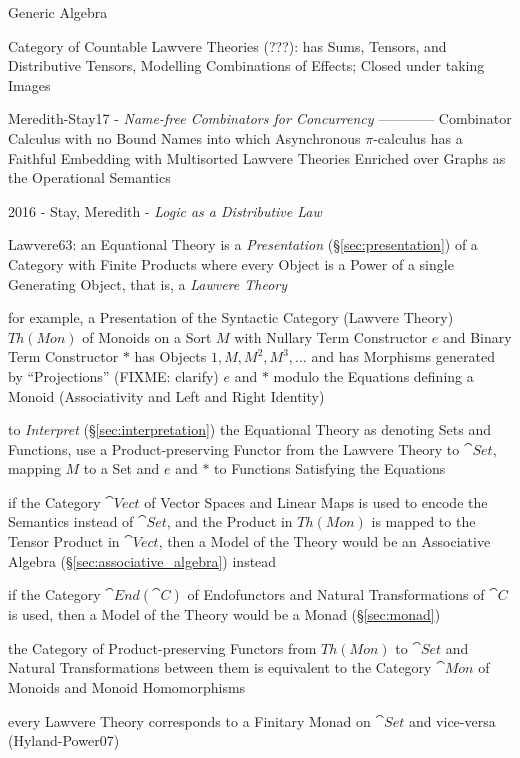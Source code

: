 Generic Algebra

Category of Countable Lawvere Theories (???): has Sums, Tensors, and
Distributive Tensors, Modelling Combinations of Effects; Closed under
taking Images \cite{hyland-power06}

Meredith-Stay17 - \emph{Name-free Combinators for Concurrency} ------------
Combinator Calculus with no Bound Names into which Asynchronous
$\pi$-calculus has a Faithful Embedding with Multisorted Lawvere
Theories Enriched over Graphs as the Operational Semantics

\asterism

2016 - Stay, Meredith - \emph{Logic as a Distributive Law}

Lawvere63: an Equational Theory is a \emph{Presentation}
(\S\ref{sec:presentation}) of a Category with Finite Products
where every Object is a Power of a single Generating Object, that is, a
\emph{Lawvere Theory}

for example, a Presentation of the Syntactic Category (Lawvere Theory) $Th(Mon)$
of Monoids on a Sort $M$ with Nullary Term Constructor $e$ and Binary Term
Constructor $*$ has Objects $1, M, M^2, M^3, \ldots$ and has Morphisms generated
by ``Projections'' (FIXME: clarify) $e$ and $*$ modulo the Equations defining a
Monoid (Associativity and Left and Right Identity)

to \emph{Interpret} (\S\ref{sec:interpretation}) the Equational Theory as
denoting Sets and Functions, use a Product-preserving Functor from the Lawvere
Theory to $\cat{Set}$, mapping $M$ to a Set and $e$ and $*$ to Functions
Satisfying the Equations

if the Category $\cat{Vect}$ of Vector Spaces and Linear Maps is used to encode
the Semantics instead of $\cat{Set}$, and the Product in $Th(Mon)$ is mapped to
the Tensor Product in $\cat{Vect}$, then a Model of the Theory would be an
Associative Algebra (\S\ref{sec:associative_algebra}) instead

if the Category $\cat{End}(\cat{C})$ of Endofunctors and Natural Transformations
of $\cat{C}$ is used, then a Model of the Theory would be a Monad
(\S\ref{sec:monad})

the Category of Product-preserving Functors from $Th(Mon)$ to $\cat{Set}$ and
Natural Transformations between them is equivalent to the Category $\cat{Mon}$
of Monoids and Monoid Homomorphisms

every Lawvere Theory corresponds to a Finitary Monad on $\cat{Set}$ and
vice-versa (Hyland-Power07)

